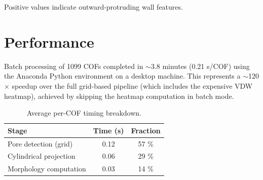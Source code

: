 \documentclass[11pt,a4paper]{article}
\begin{document}
Positive values indicate outward-protruding wall features.

\section{Performance}

Batch processing of 1099 COFs completed in $\sim$3.8 minutes
(0.21 s/COF) using the Anaconda Python environment on a desktop machine.
This represents a $\sim$120$\times$ speedup over the full grid-based
pipeline (which includes the expensive VDW heatmap), achieved by skipping
the heatmap computation in batch mode.

\begin{table}[h]
\centering
\begin{tabular}{lcc}
\toprule
Stage & Time (s) & Fraction \\
\midrule
Pore detection (grid) & 0.12 & 57 \% \\
Cylindrical projection & 0.06 & 29 \% \\
Morphology computation & 0.03 & 14 \% \\
\bottomrule
\end{tabular}
\caption{Average per-COF timing breakdown.}
\end{table}
\end{document}

